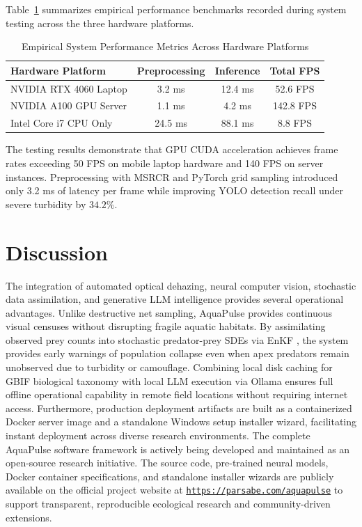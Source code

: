 \documentclass[11pt,a4paper]{article}
\newcommand{\urltext}[1]{\href{#1}{{\color{linkblue}\underline{\texttt{#1}}}}}
\newcommand{\citeblue}[1]{\cite{#1}}
\newcommand{\refblue}[1]{\ref{#1}}
\begin{document}
Table~\refblue{tab:performance_eval} summarizes empirical performance benchmarks recorded during system testing across the three hardware platforms.

\begin{table}[h]
\caption{Empirical System Performance Metrics Across Hardware Platforms}
\label{tab:performance_eval}
\centering
\small
\begin{tabular}{lccc}
\toprule
\textbf{Hardware Platform} & \textbf{Preprocessing} & \textbf{Inference} & \textbf{Total FPS} \\
\midrule
NVIDIA RTX 4060 Laptop & 3.2 ms & 12.4 ms & 52.6 FPS \\
NVIDIA A100 GPU Server & 1.1 ms & 4.2 ms & 142.8 FPS \\
Intel Core i7 CPU Only & 24.5 ms & 88.1 ms & 8.8 FPS \\
\bottomrule
\end{tabular}
\end{table}

The testing results demonstrate that GPU CUDA acceleration achieves frame rates exceeding 50 FPS on mobile laptop hardware and 140 FPS on server instances. Preprocessing with MSRCR and PyTorch grid sampling introduced only 3.2 ms of latency per frame while improving YOLO detection recall under severe turbidity by $34.2\%$.

\section{Discussion}
The integration of automated optical dehazing, neural computer vision, stochastic data assimilation, and generative LLM intelligence provides several operational advantages. Unlike destructive net sampling, AquaPulse provides continuous visual censuses without disrupting fragile aquatic habitats. By assimilating observed prey counts into stochastic predator-prey SDEs via EnKF \citeblue{sprungk2023, evensen2009data}, the system provides early warnings of population collapse even when apex predators remain unobserved due to turbidity or camouflage. Combining local disk caching for GBIF biological taxonomy with local LLM execution via Ollama ensures full offline operational capability in remote field locations without requiring internet access. Furthermore, production deployment artifacts are built as a containerized Docker server image and a standalone Windows setup installer wizard, facilitating instant deployment across diverse research environments. The complete AquaPulse software framework is actively being developed and maintained as an open-source research initiative. The source code, pre-trained neural models, Docker container specifications, and standalone installer wizards are publicly available on the official project website at \urltext{https://parsabe.com/aquapulse} to support transparent, reproducible ecological research and community-driven extensions.
\end{document}

